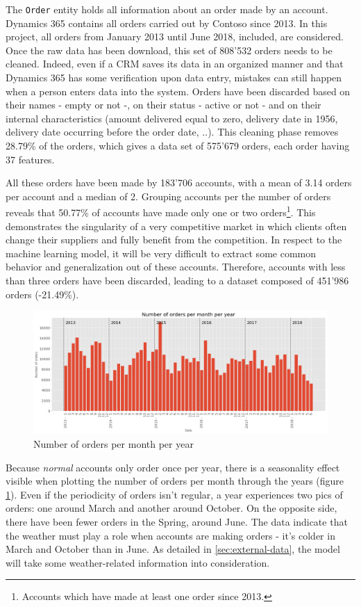 The \texttt{Order} entity holds all information about an order made by an account. Dynamics 365 contains all orders carried out by Contoso since 2013. In this project, all orders from January 2013 until June 2018, included, are considered. Once the raw data has been download, this set of 808'532 orders needs to be cleaned. Indeed, even if a CRM saves its data in an organized manner and that Dynamics 365 has some verification upon data entry, mistakes can still happen when a person enters data into the system. Orders have been discarded based on their names - empty or not -, on their status - active or not - and on their internal characteristics (amount delivered equal to zero, delivery date in 1956, delivery date occurring before the order date, ..). This cleaning phase removes 28.79\% of the orders, which gives a data set of 575'679 orders, each order having 37 features.

All these orders have been made by 183'706 accounts, with a mean of 3.14 orders per account and a median of 2. Grouping accounts per the number of orders reveals that 50.77\% of accounts have made only one or two orders\footnote{Accounts which have made at least one order since 2013.}. This demonstrates the singularity of a very competitive market in which clients often change their suppliers and fully benefit from the competition. In respect to the machine learning model, it will be very difficult to extract some common behavior and generalization out of these accounts. Therefore, accounts with less than three orders have been discarded, leading to a dataset composed of 451'986 orders (-21.49\%).

\begin{figure}[h]
    \centering
    \includegraphics[width=15cm]{images/order_month_year.png}
    \caption{Number of orders per month per year}
    \label{fig:order_per_monthyear}
\end{figure}

Because \textit{normal} accounts only order once per year, there is a seasonality effect visible when plotting the number of orders per month through  the years (figure \ref{fig:order_per_monthyear}). Even if the periodicity of orders isn't regular, a year experiences two pics of orders: one around March and another around October. On the opposite side, there have been fewer orders in the Spring, around June. The data indicate that the weather must play a role when accounts are making orders - it's colder in March and October than in June. As detailed in \ref{sec:external-data}, the model will take some weather-related information into consideration.

